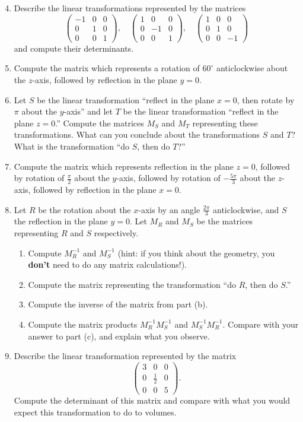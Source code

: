 \documentclass{article}
\begin{document}
\begin{enumerate}\setcounter{enumi}{3}
	\item Describe the linear transformations represented by the matrices
		\[\left(\begin{array}{ccc} -1&0&0\\0&1&0\\0&0&1\end{array}\right),\quad \left(\begin{array}{ccc} 1&0&0\\0&-1&0\\0&0&1\end{array}\right), \quad \left(\begin{array}{ccc} 1&0&0\\0&1&0\\0&0&-1\end{array}\right)\]
		and compute their determinants.
	\item Compute the matrix which represents a rotation of $60^\circ$ anticlockwise about the $z$-axis, followed by reflection in the plane $y=0$.
	\item Let $S$ be the linear transformation ``reflect in the plane $x=0$, then rotate by $\pi$ about the $y$-axis'' and let $T$ be the linear transformation ``reflect in the plane $z=0$.'' Compute the matrices $M_S$ and $M_T$ representing these transformations. What can you conclude about the transformations $S$ and $T$? What is the transformation ``do $S$, then do $T$?''
	\item Compute the matrix which represents reflection in the plane $z=0$, followed by rotation of $\frac{\pi}{2}$ about the $y$-axis, followed by rotation of $-\frac{5\pi}{3}$ about the $z$-axis, followed by reflection in the plane $x=0$.
	\item Let $R$ be the rotation about the $x$-axis by an angle $\frac{2\pi}{3}$ anticlockwise, and $S$ the reflection in the plane $y=0$. Let $M_R$ and $M_S$ be the matrices representing $R$ and $S$ respectively.
		\begin{enumerate}
			\item Compute $M_R^{-1}$ and $M_S^{-1}$ (hint: if you think about the geometry, you \textbf{don't} need to do any matrix calculations!).
			\item Compute the matrix representing the transformation ``do $R$, then do $S$.''
			\item Compute the inverse of the matrix from part (b).
			\item Compute the matrix products $M_R^{-1}M_S^{-1}$ and $M_S^{-1}M_R^{-1}$. Compare with your answer to part (c), and explain what you observe.
		\end{enumerate}
	\item Describe the linear transformation represented by the matrix
		\[\left(\begin{array}{ccc} 3&0&0\\ 0&\frac{1}{2}&0\\ 0&0&5\end{array}\right).\]
		Compute the determinant of this matrix and compare with what you would expect this transformation to do to volumes.
\end{enumerate}
\end{document}
